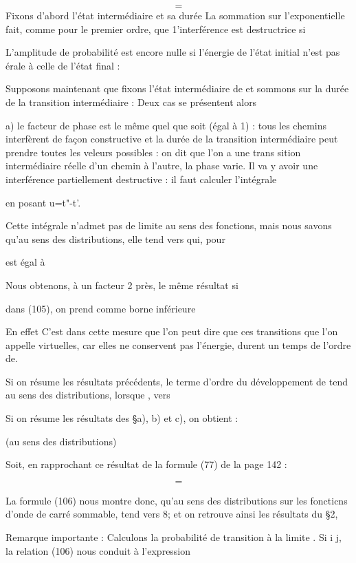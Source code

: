 
\[
\tag{(105)}=
\]
Fixons d'abord l'état intermédiaire  et sa durée
La sommation sur l'exponentielle  fait, comme
pour le premier ordre, que 1'interférence est destructrice si

L'amplitude de probabilité est encore nulle si l'énergie de l'état
initial n'est pas érale à celle de l'état final :

Supposons maintenant que  fixons l'état intermédiaire  de
et sommons sur la durée de la transition intermédiaire  : Deux
cas se présentent alors

a) le facteur de phase est le même quel que soit
(égal à 1) : tous les chemins interfèrent de façon constructive et la durée
de la transition intermédiaire peut prendre toutes les veleurs possibles :
on dit que l'on a une trans sition intermédiaire réelle
d'un chemin à l'autre, la phase varie. Il va y avoir une
interférence partiellement destructive : il faut calculer l'intégrale

en posant u=t"-t'.

Cette intégrale n'admet pas de limite au sens des fonctions, mais nous savons
qu'au sens des distributions, elle tend vers  qui, pour

 est égal à 


Nous obtenons, à un facteur 2 près, le même résultat si

dans  (105), on prend comme borne inférieure

En effet
C'est dans cette mesure que l'on peut dire que ces transitions
que l'on appelle virtuelles, car elles ne conservent pas l'énergie, durent un temps de l'ordre de.

 

Si on résume les résultats précédents, le terme d'ordre
 du développement de  tend au sens des distributions, lorsque , vers

Si on résume les résultats des \S a), b) et c), on obtient :

(au sens
des distributions)

Soit, en rapprochant ce résultat de la formule (77) de la page 142 :

\[
\tag{106}=
\]


La formule (106) nous montre donc, qu'au sens des
distributions sur les foncticns d'onde de carré sommable,
 tend vers 8; et on retrouve ainsi les résultats du \S 2,

Remarque  importante : Calculons la probabilité de transition
 à la limite . Si i  j, la relation
(106) nous conduit à l'expression

